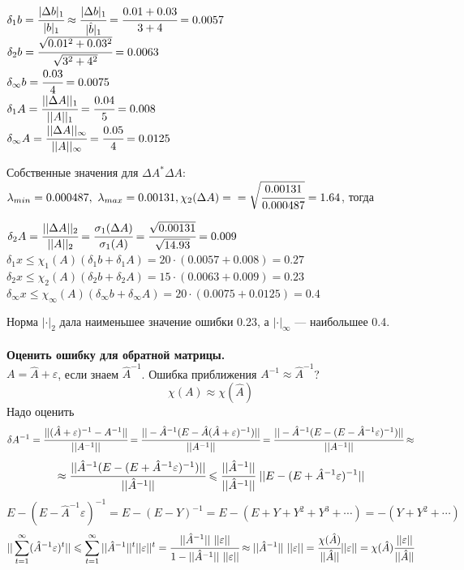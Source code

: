 \documentclass[12pt]{article}
\theoremstyle{definition}
\numberwithin{equation}{section}
\begin{document}
\begin{center}
$\delta_1 b=\cfrac{|\Delta b|_1}{|b|_1}\approx \cfrac{|\Delta b|_1}{|\hat b|_1}=\cfrac{0.01+0.03}{3+4}=0.0057$\\
$\delta_2 b=\cfrac{\sqrt{0.01^2+0.03^2}}{\sqrt{3^2+4^2}}=0.0063$\\
$\delta_{\infty}b=\cfrac{0.03}{4}=0.0075$\\
$\delta_1 A=\cfrac{||\Delta A||_1}{||A||_1}=\cfrac{0.04}{5}=0.008$\\
$\delta_{\infty} A =\cfrac{||\Delta A||_{\infty}}{||A||_{\infty}}=\cfrac{0.05}{4}=0.0125$
\end{center}
Собственные значения для $\Delta A^* \Delta A$: $\lambda_{min}=0.000487,~ \lambda_{max}=0.00131, \chi_2(\Delta A)=\\=\sqrt{\cfrac{0.00131}{0.000487}}=1.64$, тогда
\begin{center}
$\delta_2 A =\cfrac{||\Delta A||_2}{||A||_2}=\cfrac{\sigma_1(\Delta A)}{\sigma_1(A)}=\cfrac{\sqrt{0.00131}}{\sqrt{14.93}}=0.009$\\
$\delta_1 x\leqslant \chi_1(A)(\delta_1 b+\delta_1 A) =20\cdot (0.0057+0.008)=0.27$\\
$\delta_2 x\leqslant \chi_2(A)(\delta_2 b+\delta_2 A) =15\cdot (0.0063+0.009)=0.23$\\
$\delta_{\infty} x\leqslant \chi_{\infty}(A)(\delta_{\infty} b+\delta_{\infty} A) =20\cdot (0.0075+0.0125)=0.4$
\end{center}
Норма $|\cdot|_2$ дала наименьшее значение ошибки 0.23, а $|\cdot|_{\infty}$ --- наибольшее 0.4.\\
\\
\textbf{Оценить ошибку для обратной матрицы.}\\
$A=\hat A+\varepsilon$, если знаем $\hat A^{-1}$. Ошибка приближения $A^{-1}\approx \hat A^{-1}$?\\
$$\chi(A)\approx \chi(\hat A)$$
Надо оценить
$$\delta A^{-1}=\cfrac{||(\hat A+\varepsilon)^{-1}-A^{-1}||}{||A^{-1}||}=\cfrac{||-\hat A^{-1}(E-\hat A(\hat A+\varepsilon)^{-1})||}{||A^{-1}||}=\cfrac{||-\hat A^{-1}(E-(E-\hat A^{-1}\varepsilon)^{-1})||}{||A^{-1}||}\approx$$ $$\approx \cfrac{||\hat A^{-1}(E-(E+\hat A^{-1}\varepsilon)^{-1})||}{||\hat A^{-1}||}\leqslant \cfrac{||\hat A^{-1}||}{||\hat A^{-1}||}~||E-(E+\hat A^{-1}\varepsilon)^{-1}||$$
$$E-(E-\hat A^{-1} \varepsilon)^{-1}=E-(E-Y)^{-1}=E-(E+Y+Y^2+Y^3+\cdots)=-(Y+Y^2+\cdots)$$
$$||\sum\limits_{t=1}^{\infty}(\hat A^{-1}\varepsilon)^t||\leqslant\sum\limits_{t=1}^{\infty}||\hat A^{-1}||^t||\varepsilon||^t=\cfrac{||\hat A^{-1}||~||\varepsilon||}{1-||\hat A^{-1}||~||\varepsilon||}\approx||\hat A^{-1}||~||\varepsilon||=\cfrac{\chi(\hat A)}{||\hat A||}||\varepsilon||=\chi(\hat A)\cfrac{||\varepsilon||}{||\hat A||}$$
\end{document}
